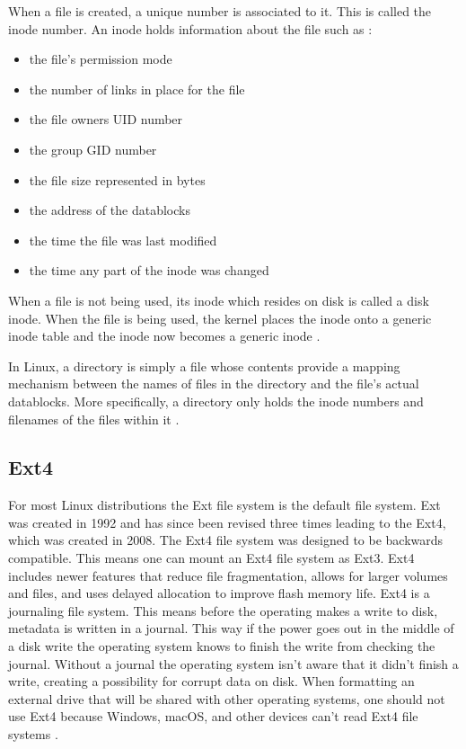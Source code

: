 \documentclass[onecolumn,draftclsnofoot, 10pt, compsoc]{IEEEtran}
\begin{document}
	When a file is created, a unique number is associated to it.
	This is called the inode number.
	An inode holds information about the file such as \cite{llinuxInodeContents}:
	\begin{itemize}
		\item the file's permission mode
		\item the number of links in place for the file
		\item the file owners UID number
		\item the group GID number
		\item the file size represented in bytes
		\item the address of the datablocks
		\item the time the file was last modified
		\item the time any part of the inode was changed
	\end{itemize}
	
	When a file is not being used, its inode which resides on disk is called a disk inode.
	When the file is being used, the kernel places the inode onto a generic inode table and the inode now becomes a generic inode \cite{llinuxFiles}.
	
	In Linux, a directory is simply a file whose contents provide a mapping mechanism between the names of files in the directory and the file's actual datablocks.
	More specifically, a directory only holds the inode numbers and filenames of the files within it \cite{llinuxFiles}.
	
	\subsection{Ext4}
		For most Linux distributions the Ext file system is the default file system.
		Ext was created in 1992 and has since been revised three times leading to the Ext4, which was created in 2008.
		The Ext4 file system was designed to be backwards compatible. This means one can mount an Ext4 file system as Ext3.
		Ext4 includes newer features that reduce file fragmentation, allows for larger volumes and files, and uses delayed allocation to improve flash memory life.
		Ext4 is a journaling file system.
		This means before the operating makes a write to disk, metadata is written in a journal.
		This way if the power goes out in the middle of a disk write the operating system knows to finish the write from checking the journal.
		Without a journal the operating system isn't aware that it didn't finish a write, creating a possibility for corrupt data on disk. 
		When formatting an external drive that will be shared with other operating systems, one should not use Ext4 because Windows, macOS, and other devices can’t read Ext4 file systems \cite{llinuxEXT4}.
	
\end{document}

